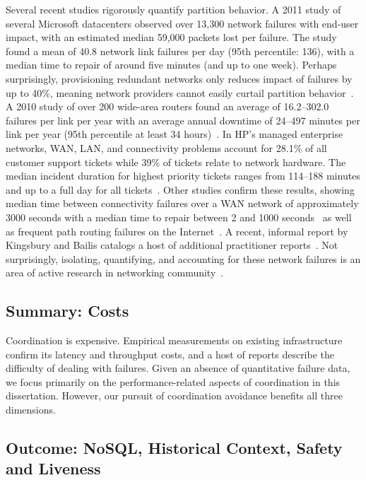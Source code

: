 Several recent studies rigorously quantify partition behavior. A 2011
study of several Microsoft datacenters observed over 13,300 network
failures with end-user impact, with an estimated median 59,000 packets
lost per failure. The study found a mean of 40.8 network link failures
per day (95th percentile: 136), with a median time to repair of around
five minutes (and up to one week). Perhaps surprisingly, provisioning
redundant networks only reduces impact of failures by up to 40\%,
meaning network providers cannot easily curtail partition
behavior~\cite{sigcomm-dc}. A 2010 study of over 200 wide-area routers
found an average of 16.2--302.0 failures per link per year with an
average annual downtime of 24--497 minutes per link per year (95th
percentile at least 34 hours)~\cite{sigcomm-wan}. In HP's managed
enterprise networks, WAN, LAN, and connectivity problems account for
28.1\% of all customer support tickets while 39\% of tickets relate to
network hardware.  The median incident duration for highest priority
tickets ranges from 114--188 minutes and up to a full day for all
tickets~\cite{turner2012failure}. Other studies confirm these results,
showing median time between connectivity failures over a WAN network
of approximately 3000 seconds with a median time to repair between 2
and 1000 seconds~\cite{ip-backbone-failures} as well as frequent path
routing failures on the Internet~\cite{labovitz-failures}. A recent,
informal report by Kingsbury and Bailis catalogs a host of additional
practitioner reports~\cite{partitions-queue14}. Not surprisingly, isolating,
quantifying, and accounting for these network failures is an area of
active research in networking community~\cite{uw-failure-networks}.

\subsection{Summary: Costs}

Coordination is expensive. Empirical measurements on existing
infrastructure confirm its latency and throughput costs, and a host of
reports describe the difficulty of dealing with failures. Given an
absence of quantitative failure data, we focus primarily on the
performance-related aspects of coordination in this
dissertation. However, our pursuit of coordination avoidance benefits
all three dimensions.


\subsection{Outcome: NoSQL, Historical Context, Safety and Liveness}

